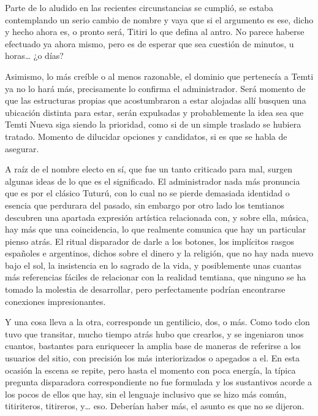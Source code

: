 \documentclass[
  spanish,
]{book}
\begin{document}
Parte de lo aludido en las recientes circunstancias se cumplió, se estaba contemplando un serio cambio de nombre y vaya que si el argumento es ese, dicho y hecho ahora es, o pronto será, Titiri lo que defina al antro. No parece haberse efectuado ya ahora mismo, pero es de esperar que sea cuestión de minutos, u horas\ldots{} ¿o días?

Asimismo, lo más creíble o al menos razonable, el dominio que pertenecía a Temti ya no lo hará más, precisamente lo confirma el administrador. Será momento de que las estructuras propias que acostumbraron a estar alojadas allí busquen una ubicación distinta para estar, serán expulsadas y probablemente la idea sea que Temti Nueva siga siendo la prioridad, como si de un simple traslado se hubiera tratado. Momento de dilucidar opciones y candidatos, si es que se habla de asegurar.

A raíz de el nombre electo en sí, que fue un tanto criticado para mal, surgen algunas ideas de lo que es el significado. El administrador nada más pronuncia que es por el clásico Tuturú, con lo cual no se pierde demasiada identidad o esencia que perdurara del pasado, sin embargo por otro lado los temtianos descubren una apartada expresión artística relacionada con, y sobre ella, música, hay más que una coincidencia, lo que realmente comunica que hay un particular pienso atrás. El ritual disparador de darle a los botones, los implícitos rasgos españoles e argentinos, dichos sobre el dinero y la religión, que no hay nada nuevo bajo el sol, la insistencia en lo sagrado de la vida, y posiblemente unas cuantas más referencias fáciles de relacionar con la realidad temtiana, que ninguno se ha tomado la molestia de desarrollar, pero perfectamente podrían encontrarse conexiones impresionantes.

Y una cosa lleva a la otra, corresponde un gentilicio, dos, o más. Como todo clon tuvo que transitar, mucho tiempo atrás hubo que crearlos, y se ingeniaron unos cuantos, bastantes para enriquecer la amplia base de maneras de referirse a los usuarios del sitio, con precisión los más interiorizados o apegados a el. En esta ocasión la escena se repite, pero hasta el momento con poca energía, la típica pregunta disparadora correspondiente no fue formulada y los sustantivos acorde a los pocos de ellos que hay, sin el lenguaje inclusivo que se hizo más común, titiriteros, titireros, y\ldots{} eso. Deberían haber más, el asunto es que no se dijeron.
\end{document}
